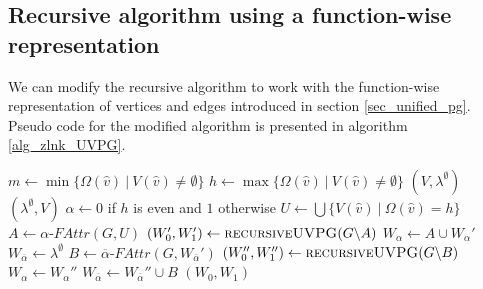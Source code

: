 \subsection{Recursive algorithm using a function-wise representation}
We can modify the recursive algorithm to work with the function-wise representation of vertices and edges introduced in section \ref{sec_unified_pg}. Pseudo code for the modified algorithm is presented in algorithm \ref{alg_zlnk_UVPG}.
\begin{algorithm}
	\caption{$\textsc{recursiveUVPG}(\textit{PG } G = (\\
		V : \hat{V} \rightarrow 2^\mathfrak{C},\\
		V_0 : \hat{V} \rightarrow 2^\mathfrak{C},\\
		V_1 : \hat{V} \rightarrow 2^\mathfrak{C},\\
		E : \hat{E} \rightarrow 2^\mathfrak{C},\\
		\Omega : \hat{V} \rightarrow \mathbb{N}))$}\label{alg_zlnk_UVPG}
	\begin{algorithmic}[1]
		\State $m \gets \min\{ \Omega(\hat{v})\ |\ V(\hat{v}) \neq \emptyset \}$
		\State $h \gets \max\{ \Omega(\hat{v})\ |\ V(\hat{v}) \neq \emptyset \}$
		\State \Return $(V,\lambda^\emptyset)$
		\Else
		\State \Return $(\lambda^\emptyset, V)$
		\EndIf
		\EndIf
		\State $\alpha \gets 0$ if $h$ is even and $1$ otherwise
		\State $U \gets \bigcup\{V(\hat{v})\ |\ \Omega(\hat{v}) = h \}$
		\State $A \gets \alpha\textit{-FAttr}(G, U)$
		\State $(W_0', W_1') \gets \textsc{recursiveUVPG}(G \backslash A)$
		\State $W_\alpha \gets A \cup W_\alpha'$
		\State $W_{\overline{\alpha}} \gets \lambda^\emptyset$
		\Else
		\State $B \gets \overline{\alpha}\textit{-FAttr}(G,W_{\overline{\alpha}}')$
		\State $(W_0'', W_1'') \gets \textsc{recursiveUVPG}(G \backslash B)$
		\State $W_\alpha \gets W_\alpha''$
		\State $W_{\overline{\alpha}} \gets W_{\overline{\alpha}}'' \cup B$
		\EndIf
		\State \Return $(W_0, W_1)$
	\end{algorithmic}
\end{algorithm}

